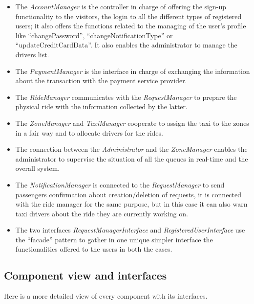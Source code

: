 \documentclass[a4paper,11pt]{report} %
\begin{document}
	\begin{itemize}
		\renewcommand{\labelitemi}{$\Rightarrow$}
		\item The \textit{AccountManager} is the controller in charge of offering the sign-up functionality to the visitors, the login to all the different types of registered users; it also offers the functions related to the managing of the user's profile like ``changePassword'', ``changeNotificationType'' or ``updateCreditCardData''. It also enables the administrator to  manage the drivers list.
		\item The \textit{PaymentManager} is the interface in charge of exchanging the information about the transaction with the payment service provider.
		\item The \textit{RideManager} communicates with the \textit{RequestManager} to prepare the physical ride with the information collected by the latter.
		\item The \textit{ZoneManager} and \textit{TaxiManager} cooperate to assign the taxi to the zones in a fair way and to allocate drivers for the rides.
		\item The connection between the \textit{Administrator} and the \textit{ZoneManager} enables the administrator to supervise the situation of all the queues in real-time and the overall system.
		\item The \textit{NotificationManager} is connected to the \textit{RequestManager} to send passengers confirmation about creation/deletion of requests, it is connected with the ride manager for the same purpose, but in this case it can also warn taxi drivers about the ride they are currently working on.
		\item The two interfaces \textit{RequestManagerInterface} and \textit{RegisteredUserInterface} use the ``facade'' pattern to gather in one unique simpler interface the functionalities offered to the users in both the cases.
	\end{itemize}	
	
	\subsection{Component view and interfaces} Here is a more detailed view of every component with its interfaces.
	
	\renewcommand{\arraystretch}{1.5}
	\setlength{\tabcolsep}{6pt}
	
		
\end{document}
